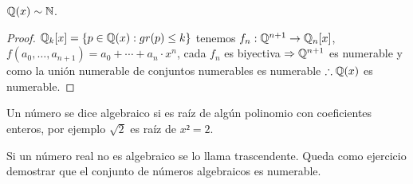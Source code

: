 \begin{eg}
	\(\mathbb{Q}(x) \sim \mathbb{N} \).
	\begin{proof}
		\(\mathbb{Q}_k[x] = \{ p \in \mathbb{Q}(x) : gr(p) \leq k \} \) tenemos \(f_n : \mathbb{Q}^{n+1} \to \mathbb{Q}_n[x]\), \(f(a_0, \ldots, a_{n+1}) = a_0 + \cdots + a_n \cdot x^n\), cada \(f_n\) es biyectiva \(\Rightarrow \mathbb{Q}^{n+1} \) es numerable y como la unión numerable de conjuntos numerables es numerable \(\therefore \mathbb{Q}(x)\) es numerable.
	\end{proof}
\end{eg}

\begin{definition}
	Un número se dice algebraico si es raíz de algún polinomio con coeficientes enteros, por ejemplo \(\sqrt{2} \) es raíz de \(x² = 2\).
\end{definition}

\begin{definition}
	Si un número real no es algebraico se lo llama trascendente. Queda como ejercicio demostrar que el conjunto de números algebraicos es numerable.
\end{definition}
